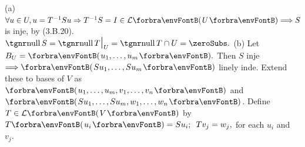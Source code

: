 (a) $\forall u\in U,u=T^{-1}Su\Rightarrow T^{-1}S=I\in\Lm{U}\Longrightarrow S$ is inje, by (3.B.20).\parSol{\Ha}
\Or $\null S=\null T\mmid_U=\null T\cap U=\zeroSubs.$\parSol{\vspace{4pt}}
(b) Let $B_U=\Par{u_1,\dots,u_m}.$ Then $S$ inje $\Longrightarrow\Par{Su_1,\dots,Su_m}$ linely inde.\parSol{\Hb}
Extend these to bases of $V$ as $\Par{u_1,\dots,u_m,v_1,\dots,v_n}$ and $\Par{Su_1,\dots,Su_m,w_1,\dots,w_n}$.\parSol{\Hb}
Define $T\in\Lm{V}$ by $T\Par{u_i}=Su_i;\,\,\,Tv_j=w_j,$ for each $u_i$ and $v_j.$\PfEnd
\SepLine



